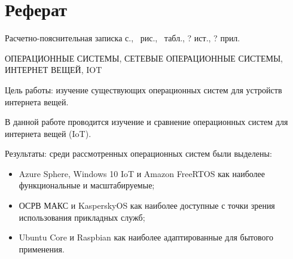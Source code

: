 \section*{Реферат}

Расчетно-пояснительная записка \pageref{LastPage} с., \totalfigures\ рис., \totaltables\ табл., ? ист., ? прил.

ОПЕРАЦИОННЫЕ СИСТЕМЫ, СЕТЕВЫЕ ОПЕРАЦИОННЫЕ СИСТЕМЫ, ИНТЕРНЕТ ВЕЩЕЙ, IOT

Цель работы: изучение существующих операционных систем для устройств интернета вещей.

В данной работе проводится изучение и сравнение операционных систем для интернета вещей (IoT).

Результаты: среди рассмотренных операционных систем были выделены:

\begin{itemize}
	\item Azure Sphere, Windows 10 IoT и Amazon FreeRTOS как наиболее функциональные и масштабируемые;
	\item ОСРВ МАКС и KasperskyOS как наиболее доступные с точки зрения использования прикладных служб;
	\item Ubuntu Core и Raspbian как наиболее адаптированные для бытового применения.
\end{itemize}

\pagebreak